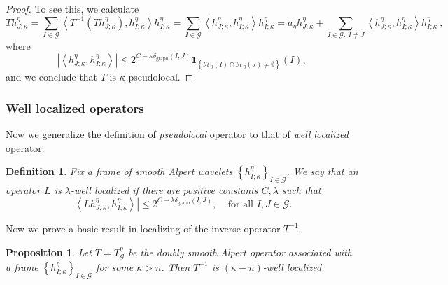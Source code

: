 \documentclass{amsart}%
\theoremstyle{plain}
\newtheorem{definition}[theorem]{Definition}
\newtheorem{proposition}[theorem]{Proposition}
\numberwithin{equation}{section}
\begin{document}
\begin{proof}
To see this, we calculate%
\begin{equation}
Th_{J;\kappa}^{\eta}=\sum_{I\in\mathcal{G}}\left\langle T^{-1}\left(
Th_{J;\kappa}^{\eta}\right)  ,h_{I;\kappa}^{\eta}\right\rangle h_{I;\kappa
}^{\eta}=\sum_{I\in\mathcal{G}}\left\langle h_{J;\kappa}^{\eta},h_{I;\kappa
}^{\eta}\right\rangle h_{I;\kappa}^{\eta}=a_{\eta}h_{J;\kappa}^{\eta}%
+\sum_{I\in\mathcal{G}:\ I\neq J}\left\langle h_{J;\kappa}^{\eta},h_{I;\kappa
}^{\eta}\right\rangle h_{I;\kappa}^{\eta}\ ,\label{ident}%
\end{equation}
where%
\begin{equation}
\left\vert \left\langle h_{J;\kappa}^{\eta},h_{I;\kappa}^{\eta}\right\rangle
\right\vert \leq2^{C-\kappa\delta_{\operatorname*{graph}}\left(  I,J\right)
}\mathbf{1}_{\left\{  \mathcal{H}_{\eta}\left(  I\right)  \cap\mathcal{H}%
_{\eta}\left(  J\right)  \neq\emptyset\right\}  }\left(  I\right)
,\label{where'}%
\end{equation}
and we conclude that $T$ is $\kappa$-pseudolocal.
\end{proof}

\subsubsection{Well localized operators}

Now we generalize the definition of \emph{pseudolocal} operator to that of
\emph{well localized} operator.

\begin{definition}
Fix a frame of smooth Alpert wavelets $\left\{  h_{I;\kappa}^{\eta}\right\}
_{I\in\mathcal{G}}$. We say that an operator $L$ is $\lambda$\emph{-well
localized} if there are positive constants $C,\lambda$ such that%
\[
\left\vert \left\langle Lh_{J;\kappa}^{\eta},h_{I;\kappa}^{\eta}\right\rangle
\right\vert \leq2^{C-\lambda\delta_{\operatorname*{graph}}\left(  I,J\right)
},\ \ \ \ \ \text{for all }I,J\in\mathcal{G}.
\]

\end{definition}

Now we prove a basic result in localizing of the inverse operator $T^{-1}$.

\begin{proposition}
\label{T inv well}Let $T=T_{\mathcal{G}}^{\eta}$ be the doubly smooth Alpert
operator associated with a frame $\left\{  h_{I;\kappa}^{\eta}\right\}
_{I\in\mathcal{G}}$ for some $\kappa>n$. Then $T^{-1}$ is $\left(
\kappa-n\right)  $-well localized.
\end{proposition}
\end{document}
